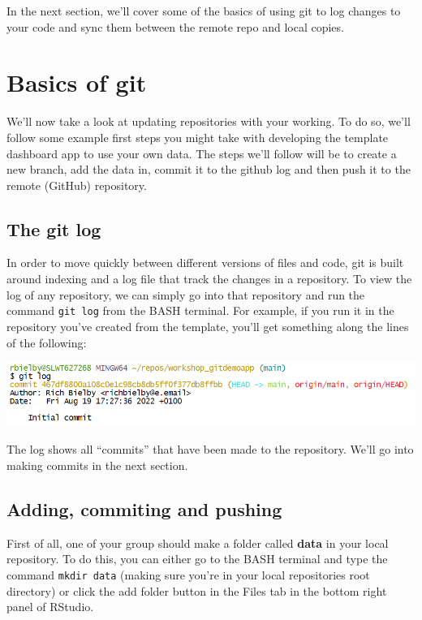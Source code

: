 \documentclass[
  12pt,
]{article}
\begin{document}
In the next section, we'll cover some of the basics of using git to log
changes to your code and sync them between the remote repo and local
copies.

\newpage

\hypertarget{basics-of-git}{%
\section{Basics of git}\label{basics-of-git}}

We'll now take a look at updating repositories with your working. To do
so, we'll follow some example first steps you might take with developing
the template dashboard app to use your own data. The steps we'll follow
will be to create a new branch, add the data in, commit it to the github
log and then push it to the remote (GitHub) repository.

\hypertarget{the-git-log}{%
\subsection{The git log}\label{the-git-log}}

In order to move quickly between different versions of files and code,
git is built around indexing and a log file that track the changes in a
repository. To view the log of any repository, we can simply go into
that repository and run the command \texttt{git\ log} from the BASH
terminal. For example, if you run it in the repository you've created
from the template, you'll get something along the lines of the
following:

\begin{center}\includegraphics[width=0.8\linewidth]{images/gitdemo/gitdemo-gitlog-1} \end{center}

The log shows all ``commits'' that have been made to the repository.
We'll go into making commits in the next section.

\hypertarget{adding-commiting-and-pushing}{%
\subsection{Adding, commiting and
pushing}\label{adding-commiting-and-pushing}}

First of all, one of your group should make a folder called
\textbf{data} in your local repository. To do this, you can either go to
the BASH terminal and type the command \texttt{mkdir\ data} (making sure
you're in your local repositories root directory) or click the add
folder button in the Files tab in the bottom right panel of RStudio.
\end{document}
